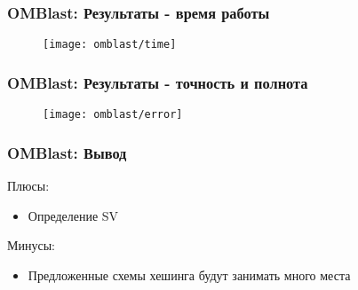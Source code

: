 \begin{frame}
\frametitle{OMBlast: Результаты - время работы}
  \begin{figure}
    \centering
    \texttt{[image: omblast/time]}
  \end{figure}

\end{frame}

\begin{frame}
\frametitle{OMBlast: Результаты - точность и полнота }
  \begin{figure}
    \centering
    \texttt{[image: omblast/error]}
  \end{figure}

\end{frame}

\begin{frame}
\frametitle{OMBlast: Вывод }
Плюсы:
\begin{itemize}
  \item Определение SV
\end{itemize}
Минусы:
\begin{itemize}
  \item Предложенные схемы хешинга будут занимать много места
\end{itemize}
\end{frame}

